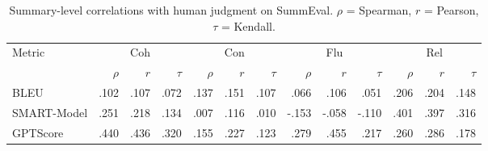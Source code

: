 \begin{table}[t]
\centering
\caption{Summary-level correlations with human judgment on SummEval. $\rho$ = Spearman, $r$ = Pearson, $\tau$ = Kendall.}
\label{tab:correlations}
\begin{tabular}{lrrrrrrrrrrrr}
\toprule
Metric & \multicolumn{3}{c}{Coh} & \multicolumn{3}{c}{Con} & \multicolumn{3}{c}{Flu} & \multicolumn{3}{c}{Rel} \\
\cmidrule(lr){2-4} \cmidrule(lr){5-7} \cmidrule(lr){8-10} \cmidrule(lr){11-13} 
  & $\rho$ & $r$ & $\tau$ & $\rho$ & $r$ & $\tau$ & $\rho$ & $r$ & $\tau$ & $\rho$ & $r$ & $\tau$ \\
\midrule
BLEU & .102 & .107 & .072 & .137 & .151 & .107 & .066 & .106 & .051 & .206 & .204 & .148 \\
SMART-Model & .251 & .218 & .134 & .007 & .116 & .010 & -.153 & -.058 & -.110 & .401 & .397 & .316 \\
GPTScore & .440 & .436 & .320 & .155 & .227 & .123 & .279 & .455 & .217 & .260 & .286 & .178 \\
\bottomrule
\end{tabular}
\end{table}
